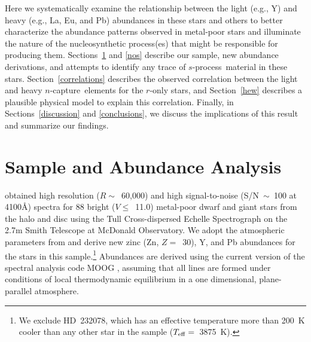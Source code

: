 \documentclass{emulateapj}
\def\spro{\mbox{$s$-process}}
\def\ncap{\mbox{$n$-capture}}
\begin{document}
Here we systematically examine the 
relationship between the light (e.g., Y) and heavy (e.g., La, Eu, and Pb)
abundances in these stars and others to better characterize
the abundance patterns observed in metal-poor stars
and illuminate the nature of the 
nucleosynthetic process(es) that might be responsible for
producing them.
Sections~\ref{sample} and \ref{nos} 
describe our sample, new abundance derivations, and
attempts to identify any trace of \spro\ material in these stars.
Section~\ref{correlations} describes the observed correlation
between the light and heavy \ncap\ elements for the $r$-only stars, and 
Section~\ref{hew} describes a plausible physical model
to explain this correlation.
Finally, in Sections~\ref{discussion} and \ref{conclusions}, we
discuss the implications of this result and summarize our findings.


\section{Sample and Abundance Analysis}
\label{sample}


\citet{simmerer04} obtained high resolution ($R \sim$~60,000)
and high signal-to-noise (S/N~$\sim$~100 at 4100\AA) spectra
for 88 bright ($V \leq$~11.0) metal-poor dwarf and giant 
stars from the halo and disc
using the Tull Cross-dispersed Echelle Spectrograph
\citep{tull95} on the 2.7m Smith Telescope at McDonald Observatory.
We adopt the atmospheric parameters from \citet{simmerer04} and
derive new zinc (Zn, $Z =$~30), Y, and Pb
abundances for the stars in this sample.\footnote{
We exclude HD~232078, which has an effective temperature
more than 200~K cooler than any other star in the sample
($T_{\rm eff} =$~3875~K).}
Abundances are derived using the current version of the 
spectral analysis code MOOG
\citep{sneden73}, assuming that all lines are formed 
under conditions of local thermodynamic equilibrium in a
one dimensional, plane-parallel atmosphere.
\end{document}

